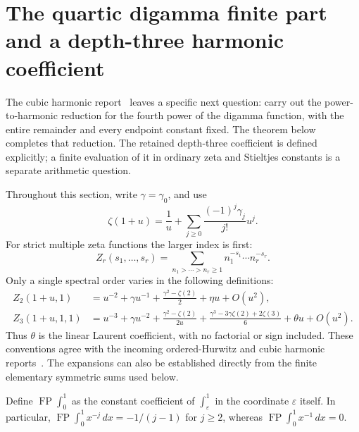 \documentclass[11pt,a4paper]{article}
\numberwithin{equation}{section}
\theoremstyle{definition}
\theoremstyle{remark}
\begin{document}



\section{The quartic digamma finite part and a depth-three harmonic coefficient}
\label{q4:section}

The cubic harmonic report~\cite{IncomingCubic} leaves a specific
next question: carry out the
power-to-harmonic reduction for the fourth power of the digamma function,
with the entire remainder and every endpoint constant fixed.  The theorem
below completes that reduction.  The retained depth-three coefficient is
defined explicitly; a finite evaluation of it in ordinary zeta and
Stieltjes constants is a separate arithmetic question.

Throughout this section, write $\gamma=\gamma_0$, and use
\[
 \zeta(1+u)=\frac1u+\sum_{j\geq0}\frac{(-1)^j\gamma_j}{j!}u^j.
\]
For strict multiple zeta functions the larger index is first:
\[
 Z_r(s_1,\ldots,s_r)
 =\sum_{n_1>\cdots>n_r\geq1}n_1^{-s_1}\cdots n_r^{-s_r}.
\]
Only a single spectral order varies in the following definitions:
\begin{align}
 Z_2(1+u,1)
 &=u^{-2}+\gamma u^{-1}+\frac{\gamma^2-\zeta(2)}2
       +\eta u+O(u^2),\label{q4:eta}\\
 Z_3(1+u,1,1)
 &=u^{-3}+\gamma u^{-2}
       +\frac{\gamma^2-\zeta(2)}{2u}
       +\frac{\gamma^3-3\gamma\zeta(2)+2\zeta(3)}6
       +\theta u+O(u^2).\label{q4:theta}
\end{align}
Thus $\theta$ is the linear Laurent coefficient, with no factorial or sign
included.  These conventions agree with the incoming ordered-Hurwitz and
cubic harmonic reports~\cite{IncomingOrdered,IncomingCubic}.
The expansions can also be established directly
from the finite elementary symmetric sums used below.

Define $\operatorname{FP}\int_0^1$ as the constant coefficient of
$\int_\varepsilon^1$ in the coordinate $\varepsilon$ itself.  In particular,
$\operatorname{FP}\int_0^1x^{-j}\,dx=-1/(j-1)$ for $j\geq2$, whereas
$\operatorname{FP}\int_0^1x^{-1}\,dx=0$.
\end{document}
